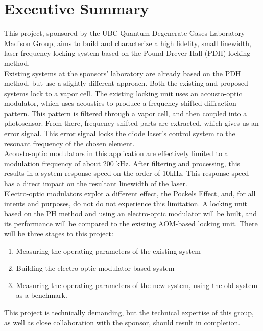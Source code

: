 \newpage
\section*{Executive Summary}

This project, sponsored by the UBC Quantum Degenerate Gases
Laboratory---Madison Group, aims to build and characterize a high
fidelity, small linewidth, laser frequency locking system based on the
Pound-Drever-Hall (PDH) locking method. \\

Existing systems at the sponsors' laboratory are already based
on the PDH method, but use a slightly different approach.  Both the
existing and proposed systems lock to a vapor cell.  The
existing locking unit uses an acousto-optic modulator, which uses acoustics
to produce a frequency-shifted diffraction pattern.  This pattern is filtered
through a vapor cell, and then coupled into a photosensor.  From there,
frequency-shifted parts are extracted, which gives us an error signal.  This
error signal locks the diode laser's control system to the resonant frequency
of the chosen element. \\

Acousto-optic modulators in this application are effectively limited to a
modulation frequency of about 200 kHz. After filtering and processing, this
results in a system response speed  on the order of 10kHz. This response speed
has a direct impact on the resultant linewidth of the laser.  \\

Electro-optic modulators explot a different effect, the Pockels Effect, and,
for all intents and purposes, do not do not experience this limitation. A
locking unit based on the PH method and using an electro-optic modulator will
be built, and its performance will be compared to the existing AOM-based
locking unit. There will be three stages to this project:
\begin{enumerate}
 \item Measuring the operating parameters of the existing system
 \item Building the electro-optic modulator based system
 \item Measuring the operating parameters of the new system, using the
 old system as a benchmark.
\end{enumerate}
This project is technically demanding, but the technical expertise of this
group, as well as close collaboration with the sponsor, should result in
completion.

